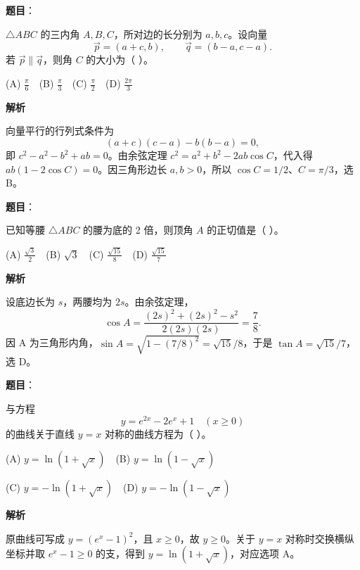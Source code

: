 \begin{answer}

\textbf{题目}：

\(\triangle ABC\) 的三内角 \(A,B,C\)，所对边的长分别为 \(a,b,c\)。设向量
\nopagebreak[4]
\[
\vec p=(a+c,b),\qquad \vec q=(b-a,c-a).
\]
若 \(\vec p\parallel\vec q\)，则角 \(C\) 的大小为（ ）。

(A) \(\frac\pi6\)　(B) \(\frac\pi3\)　(C) \(\frac\pi2\)　(D) \(\frac{2\pi}3\)

\textbf{解析}

向量平行的行列式条件为
\nopagebreak[4]
\[
(a+c)(c-a)-b(b-a)=0,
\]
即 $c^2-a^2-b^2+ab=0$。由余弦定理 $c^2=a^2+b^2-2ab\cos C$，代入得 $ab(1-2\cos C)=0$。因三角形边长 $a,b>0$，所以 $\cos C=1/2$、$C=\pi/3$，选 B。


\end{answer}
\begin{answer}

\textbf{题目}：

已知等腰 \(\triangle ABC\) 的腰为底的 2 倍，则顶角 \(A\) 的正切值是（ ）。

(A) \(\frac{\sqrt3}{2}\)　(B) \(\sqrt3\)　(C) \(\frac{\sqrt{15}}8\)　(D) \(\frac{\sqrt{15}}7\)

\textbf{解析}

设底边长为 $s$，两腰均为 $2s$。由余弦定理，
\nopagebreak[4]
\[
\cos A=\frac{(2s)^2+(2s)^2-s^2}{2(2s)(2s)}=\frac78.
\]
因 A 为三角形内角，$\sin A=\sqrt{1-(7/8)^2}=\sqrt{15}/8$，于是 $\tan A=\sqrt{15}/7$，选 D。


\end{answer}
\begin{answer}

\textbf{题目}：

与方程
\nopagebreak[4]
\[
y=e^{2x}-2e^x+1\quad (x\ge 0)
\]
的曲线关于直线 \(y=x\) 对称的曲线方程为（ ）。

(A) \(y=\ln(1+\sqrt{x})\)　(B) \(y=\ln(1-\sqrt{x})\)

(C) \(y=-\ln(1+\sqrt{x})\)　(D) \(y=-\ln(1-\sqrt{x})\)

\textbf{解析}

原曲线可写成 $y=(e^x-1)^2$，且 $x\ge0$，故 $y\ge0$。关于 $y=x$ 对称时交换横纵坐标并取 $e^x-1\ge0$ 的支，得到 $y=\ln(1+\sqrt{x})$，对应选项 A。


\end{answer}
